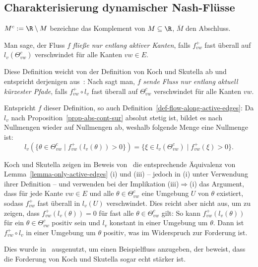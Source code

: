 \subsection{Charakterisierung dynamischer Nash-Flüsse}

\begin{notation}
	 $M^c:= \R\setminus M$ bezeichne das Komplement von $M\subseteq\R$, $\overline{M}$ den Abschluss.
\end{notation}

\begin{definition}\label{def-flow-along-active-edges}
	Man sage, der Fluss $f$ \emph{fließe nur entlang aktiver Kanten}, falls $f_{vw}^+$ fast überall auf $l_v(\Theta_{vw}^c)$ verschwindet für alle Kanten $vw\in E$.
\end{definition}

\begin{remark}
	Diese Definition weicht von der Definition von Koch und Skutella ab und entspricht derjenigen aus~\cite[Definition 1]{Cominetti2015}:
	Nach \cite[Definition 2]{Koch2011} sagt man, $f$ \emph{sende Fluss nur entlang aktuell kürzester Pfade}, falls $f_{vw}^+\circ l_v$ fast überall auf $\Theta_{vw}^c$ verschwindet für alle Kanten $vw$.

	Entspricht $f$ dieser Definition, so auch Definition~\ref{def-flow-along-active-edges}: 
	Da $l_v$ nach Proposition~\ref{prop-abs-cont-sur} absolut stetig ist, bildet es nach~\cite[Aufgabe 4.9]{Elstrodt2011Abs} Nullmengen wieder auf Nullmengen ab, weshalb folgende Menge eine Nullmenge ist: \[ l_v(\{ \theta \in \Theta_{vw}^c \mid f_{vw}^+ (l_v(\theta)) > 0 \}) = \{ \xi \in l_v(\Theta_{vw}^c) \mid f_{vw}^+ (\xi) > 0 \}. \]
	 
	Koch und Skutella zeigen im Beweis von~\cite[Lemma 1]{Koch2011} die entsprechende Äquivalenz von Lemma~\ref{lemma-only-active-edges} (i) und (iii) -- jedoch in (i) unter Verwendung ihrer Definition -- und
	verwenden bei der Implikation (iii)$\Rightarrow$(i) das Argument, dass für jede Kante $vw\in E$ und alle $\theta\in \Theta_{vw}^c$ eine Umgebung $U$ von $\theta$ existiert, sodass $f_{vw}^+$ fast überall in $l_v(U)$ verschwindet.
	Dies reicht aber nicht aus, um zu zeigen, dass $f_{vw}^+(l_v(\theta))=0$ für fast alle $\theta\in\Theta_{vw}^c$ gilt:
	So kann $f_{vw}^+(l_v(\theta))$ für ein $\theta\in\Theta_{vw}^c$ positiv sein und $l_v$ konstant in einer Umgebung um $\theta$.
	Dann ist $f_{vw}^+ \circ l_v$ in einer Umgebung um $\theta$ positiv, was im Widerspruch zur Forderung ist.
	
	Dies wurde in~\cite[Example 2]{Cominetti2015} ausgenutzt, um einen Beispielfluss anzugeben, der beweist, dass die Forderung von Koch und Skutella sogar echt stärker ist.
\end{remark}

